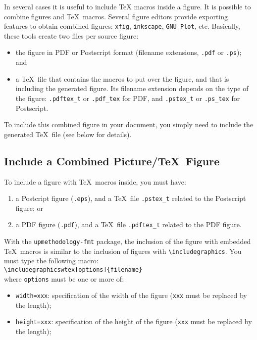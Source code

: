 \documentclass[book,taskpackage,specpackage,codepackage]{upmethodology-document}
\begin{document}
In several cases it is useful to include \TeX\xspace macros inside a figure. It is possible to combine figures and \TeX\ macros. Several figure editors provide exporting features to obtain combined figures: \texttt{xfig}, \texttt{inkscape}, \texttt{GNU Plot}, etc. Basically, these tools create two files per source figure: \begin{itemize}
\item the figure in PDF or Postscript format (filename extensions, \texttt{.pdf} or \texttt{.ps}); and
\item a \TeX\ file that contains the macros to put over the figure, and that is including the generated figure. Its filename extension depends on the type of the figure: \texttt{.pdftex\_t} or \texttt{.pdf\_tex} for PDF, and \texttt{.pstex\_t} or \texttt{.ps\_tex} for Postscript.
\end{itemize}
To include this combined figure in your document, you simply need to include the generated \TeX\ file (see below for details).

\subsection{Include a Combined Picture/\TeX\ Figure}

To include a figure with \TeX\ macros inside, you must have: \begin{enumerate}
\item a Postcript figure (\texttt{.eps}), and a \TeX\ file \texttt{.pstex\_t} related to the Postscript figure; or
\item a PDF figure (\texttt{.pdf}), and a \TeX\ file \texttt{.pdftex\_t} related to the PDF figure.
\end{enumerate}

With the \texttt{upmethodology-fmt} package, the inclusion of the figure with embedded \TeX\ macros is similar to the inclusion of figures with \texttt{{\textbackslash}includegraphics}. You must type the following macro: \\
\texttt{{\textbackslash}includegraphicswtex[options]\{filename\}} \\
where \texttt{options} must be one or more of: \begin{itemize}
\item \texttt{width=xxx}: specification of the width of the figure (\texttt{xxx} must be replaced by the length);
\item \texttt{height=xxx}: specification of the height of the figure (\texttt{xxx} must be replaced by the length);
\end{itemize}
\end{document}
